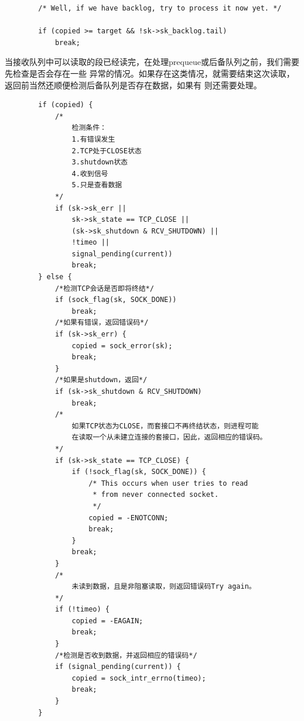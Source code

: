 \begin{verbatim}
        /* Well, if we have backlog, try to process it now yet. */

        if (copied >= target && !sk->sk_backlog.tail)
            break;
\end{verbatim}

	当接收队列中可以读取的段已经读完，在处理prequeue或后备队列之前，我们需要先检查是否会存在一些
	异常的情况。如果存在这类情况，就需要结束这次读取，返回前当然还顺便检测后备队列是否存在数据，如果有
	则还需要处理。

\begin{verbatim}
        if (copied) {
            /*
                检测条件：
                1.有错误发生
                2.TCP处于CLOSE状态
                3.shutdown状态
                4.收到信号
                5.只是查看数据
            */          
            if (sk->sk_err ||
                sk->sk_state == TCP_CLOSE ||
                (sk->sk_shutdown & RCV_SHUTDOWN) ||
                !timeo ||
                signal_pending(current))
                break;
        } else {
            /*检测TCP会话是否即将终结*/
            if (sock_flag(sk, SOCK_DONE))
                break;
            /*如果有错误，返回错误码*/
            if (sk->sk_err) {
                copied = sock_error(sk);
                break;
            }
            /*如果是shutdown，返回*/
            if (sk->sk_shutdown & RCV_SHUTDOWN)
                break;
            /*
                如果TCP状态为CLOSE，而套接口不再终结状态，则进程可能
                在读取一个从未建立连接的套接口，因此，返回相应的错误码。
            */
            if (sk->sk_state == TCP_CLOSE) {
                if (!sock_flag(sk, SOCK_DONE)) {
                    /* This occurs when user tries to read
                     * from never connected socket.
                     */
                    copied = -ENOTCONN;
                    break;
                }
                break;
            }
            /*
                未读到数据，且是非阻塞读取，则返回错误码Try again。
            */
            if (!timeo) {
                copied = -EAGAIN;
                break;
            }
            /*检测是否收到数据，并返回相应的错误码*/
            if (signal_pending(current)) {
                copied = sock_intr_errno(timeo);
                break;
            }
        }
\end{verbatim}

